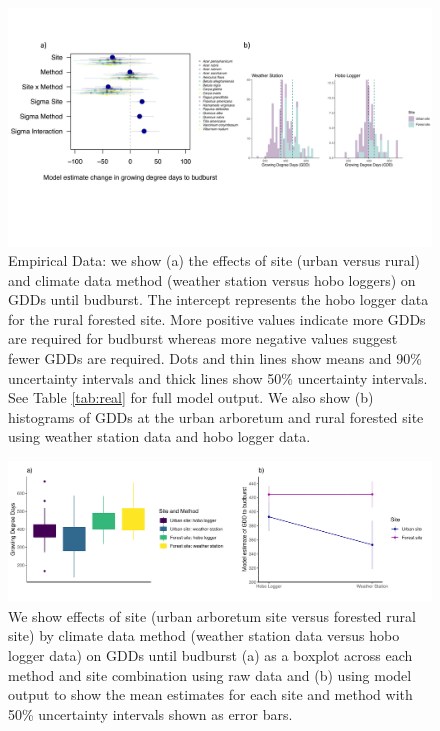 \documentclass{article}\usepackage[]{graphicx}\usepackage[]{color}
\begin{document}
\begin{figure}[H]
    \centering
    \includegraphics[width=16cm, trim=0cm 5cm 0cm 0cm,]{..//analyses/figures/muandgdd.pdf}
\caption{ Empirical Data: we show (a) the effects of site (urban versus rural) and climate data method (weather station versus hobo loggers) on GDDs until budburst. The intercept represents the hobo logger data for the rural forested site. More positive values indicate more GDDs are required for budburst whereas more negative values suggest fewer GDDs are required. Dots and thin lines show means and 90\% uncertainty intervals and thick lines show 50\% uncertainty intervals. See Table \ref{tab:real} for full model output. We also show (b) histograms of GDDs at the urban arboretum and rural forested site using weather station data and hobo logger data.}
\label{fig:real}
\end{figure}

\begin{figure}[H]
      \centering
      \includegraphics[width=16cm]{..//analyses/figures/gdd_interaction.pdf}
\caption{ We show effects of site (urban arboretum site versus forested rural site) by climate data method (weather station data versus hobo logger data) on GDDs until budburst (a) as a boxplot across each method and site combination using raw data and (b) using model output to show the mean estimates for each site and method with 50\% uncertainty intervals shown as error bars.}
\label{fig:interaction}
\end{figure}



  
  
\end{document}
